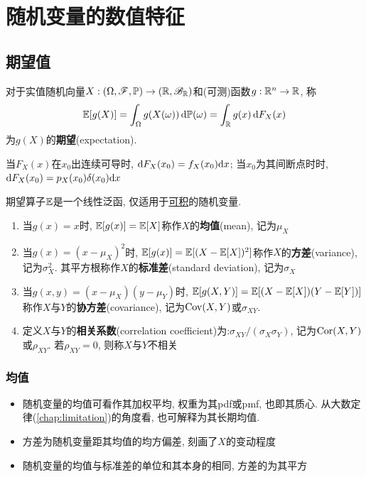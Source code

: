 \chapter{随机变量的数值特征}

\section{期望值}

\begin{definition}
    对于实值随机向量$X : (\Omega,\mathscr{F},\mathbb{P}) \to (\mathbb{R},\mathscr{B}_{\mathbb{R}})$和(可测)函数$g : \mathbb{R}^n \to \mathbb{R}$, 称
    \[ \mathbb{E}[g(X)] = \int_{\Omega} g(X(\omega))\,\mathrm{d}\mathbb{P}(\omega) = \int_{\mathbb{R}} g(x) \,\mathrm{d} F_{X}(x) \]
    为$g(X)$的\textbf{期望}(expectation).
\end{definition}

\begin{remark}
    当$F_{X}(x)$在$x_0$出连续可导时, $\mathrm{d} F_{X}(x_0)=f_{X}(x_0)\mathrm{d} x$; 当$x_0$为其间断点时时, $\mathrm{d} F_{X}(x_0)=p_{X}(x_0)\delta(x_0)\mathrm{d} x$
\end{remark}

期望算子$\mathbb{E}$是一个线性泛函, 仅适用于\underline{可积}的随机变量.

\begin{definition}
    \begin{enumerate}
        \item 当$g(x)=x$时, $\mathbb{E}[g(x)]=\mathbb{E}[X]$称作$X$的\textbf{均值}(mean), 记为$\mu_{X}$
        \item 当$g(x)=(x-\mu_{X})^{2}$时, $\mathbb{E}[g(x)]=\mathbb{E}[(X-\mathbb{E}[X])^{2}]$称作$X$的\textbf{方差}(variance), 记为$\sigma^2_{X}$. 其平方根称作$X$的\textbf{标准差}(standard deviation), 记为$\sigma_{X}$
        \item 当$g(x,y)=(x-\mu_{X})(y-\mu_{Y})$时, $\mathbb{E}[g(X,Y)]=\mathbb{E}[(X-\mathbb{E}[X])(Y-\mathbb{E}[Y])]$称作$X$与$Y$的\textbf{协方差}(covariance), 记为$\operatorname{Cov}(X,Y)$或$\sigma_{XY}$.
        \item 定义$X$与$Y$的\textbf{相关系数}(correlation coefficient)为:$\sigma_{XY}/(\sigma_{X}\sigma_{Y})$, 记为$\operatorname{Cor}(X,Y)$或$\rho_{XY}$. 若$\rho_{XY}=0$, 则称$X$与$Y$不相关
    \end{enumerate}
\end{definition}

\subsection{均值}

\begin{remark}
    \begin{itemize}
        \item 随机变量的均值可看作其加权平均, 权重为其pdf或pmf, 也即其质心. 从大数定律(\ref{chap:limitation})的角度看, 也可解释为其长期均值.
        \item 方差为随机变量距其均值的均方偏差, 刻画了$X$的变动程度
        \item 随机变量的均值与标准差的单位和其本身的相同, 方差的为其平方
    \end{itemize}
\end{remark}

